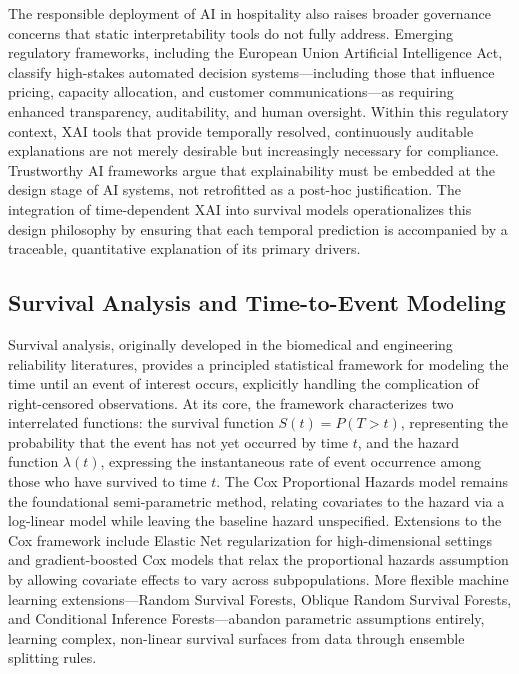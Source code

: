 \documentclass[pdflatex,iicol,sn-mathphys-ay]{sn-jnl}
\theoremstyle{thmstyleone}%
\theoremstyle{thmstyletwo}%
\theoremstyle{thmstylethree}%
\begin{document}
The responsible deployment of AI in hospitality also raises broader governance concerns that static interpretability tools do not fully address. Emerging regulatory frameworks, including the European Union Artificial Intelligence Act, classify high-stakes automated decision systems—including those that influence pricing, capacity allocation, and customer communications—as requiring enhanced transparency, auditability, and human oversight. Within this regulatory context, XAI tools that provide temporally resolved, continuously auditable explanations are not merely desirable but increasingly necessary for compliance. Trustworthy AI frameworks \citep{thiebes2021trustworthy, meske2022explainable} argue that explainability must be embedded at the design stage of AI systems, not retrofitted as a post-hoc justification. The integration of time-dependent XAI into survival models operationalizes this design philosophy by ensuring that each temporal prediction is accompanied by a traceable, quantitative explanation of its primary drivers.

\subsection{Survival Analysis and Time-to-Event Modeling}

Survival analysis, originally developed in the biomedical and engineering reliability literatures, provides a principled statistical framework for modeling the time until an event of interest occurs, explicitly handling the complication of right-censored observations. At its core, the framework characterizes two interrelated functions: the survival function $S(t) = P(T > t)$, representing the probability that the event has not yet occurred by time $t$, and the hazard function $\lambda(t)$, expressing the instantaneous rate of event occurrence among those who have survived to time $t$. The Cox Proportional Hazards model \citep{kleinbaum2012survival} remains the foundational semi-parametric method, relating covariates to the hazard via a log-linear model while leaving the baseline hazard unspecified. Extensions to the Cox framework include Elastic Net regularization for high-dimensional settings and gradient-boosted Cox models that relax the proportional hazards assumption by allowing covariate effects to vary across subpopulations. More flexible machine learning extensions—Random Survival Forests, Oblique Random Survival Forests, and Conditional Inference Forests—abandon parametric assumptions entirely, learning complex, non-linear survival surfaces from data through ensemble splitting rules.
\end{document}
